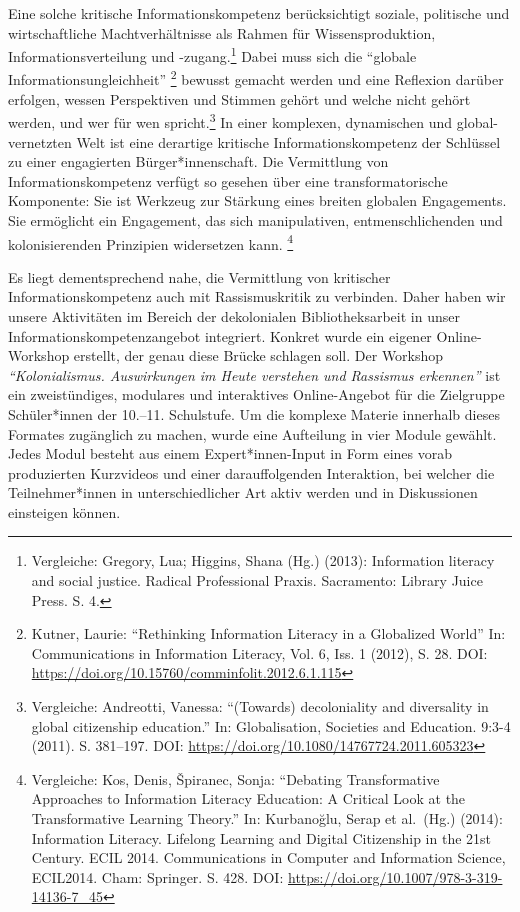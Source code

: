 \documentclass[a4paper,
fontsize=11pt,
oneside,
numbers=noperiodatend,
parskip=half-,
bibliography=totoc,
final
]{scrartcl}
\begin{document}
Eine solche kritische Informationskompetenz berücksichtigt soziale,
politische und wirtschaftliche Machtverhältnisse als Rahmen für
Wissensproduktion, Informationsverteilung und -zu\-gang.\footnote{Vergleiche:
  Gregory, Lua; Higgins, Shana (Hg.) (2013): Information literacy and
  social justice. Radical Professional Praxis. Sacramento: Library Juice
  Press. S. 4.} Dabei muss sich die \enquote{globale
Informationsungleichheit} \footnote{Kutner, Laurie: \enquote{Rethinking
  Information Literacy in a Globalized World} In: Communications in
  Information Literacy, Vol. 6, Iss. 1 (2012), S. 28. DOI:
  \url{https://doi.org/10.15760/comminfolit.2012.6.1.115}} bewusst
gemacht werden und eine Reflexion darüber erfolgen, wessen Perspektiven
und Stimmen gehört und welche nicht gehört werden, und wer für wen
spricht.\footnote{Vergleiche: Andreotti, Vanessa: \enquote{(Towards)
  decoloniality and diversality in global citizenship education.} In:
  Globalisation, Societies and Education. 9:3-4 (2011). S. 381--197.
  DOI: \url{https://doi.org/10.1080/14767724.2011.605323}} In einer
komplexen, dynamischen und global-vernetzten Welt ist eine derartige
kritische Informationskompetenz der Schlüssel zu einer engagierten
Bürger*innenschaft. Die Vermittlung von Informationskompetenz verfügt so
gesehen über eine transformatorische Komponente: Sie ist Werkzeug zur
Stärkung eines breiten globalen Engagements. Sie ermöglicht ein
Engagement, das sich manipulativen, entmenschlichenden und
kolonisierenden Prinzipien widersetzen kann. \footnote{Vergleiche: Kos,
  Denis, Špiranec, Sonja: \enquote{Debating Transformative Approaches to
  Information Literacy Education: A Critical Look at the Transformative
  Learning Theory.} In: Kurbanoğlu, Serap et al.~(Hg.) (2014):
  Information Literacy. Lifelong Learning and Digital Citizenship in the
  21st Century. ECIL 2014. Communications in Computer and Information
  Science, ECIL2014. Cham: Springer. S. 428. DOI:
  \url{https://doi.org/10.1007/978-3-319-14136-7_45}}

Es liegt dementsprechend nahe, die Vermittlung von kritischer
Informationskompetenz auch mit Rassismuskritik zu verbinden. Daher haben
wir unsere Aktivitäten im Bereich der dekolonialen Bibliotheksarbeit in
unser Informationskompetenzangebot integriert. Konkret wurde ein eigener
Online-Workshop erstellt, der genau diese Brücke schlagen soll. Der
Workshop \emph{\enquote{Kolonialismus. Auswirkungen im Heute verstehen
und Rassismus erkennen}} ist ein zweistündiges, modulares und
interaktives Online-Angebot für die Zielgruppe Schüler*innen der
10.--11. Schulstufe. Um die komplexe Materie innerhalb dieses Formates
zugänglich zu machen, wurde eine Aufteilung in vier Module gewählt.
Jedes Modul besteht aus einem Expert*innen-Input in Form eines vorab
produzierten Kurzvideos und einer darauffolgenden Interaktion, bei
welcher die Teilnehmer*innen in unterschiedlicher Art aktiv werden und
in Diskussionen einsteigen können.
\end{document}
